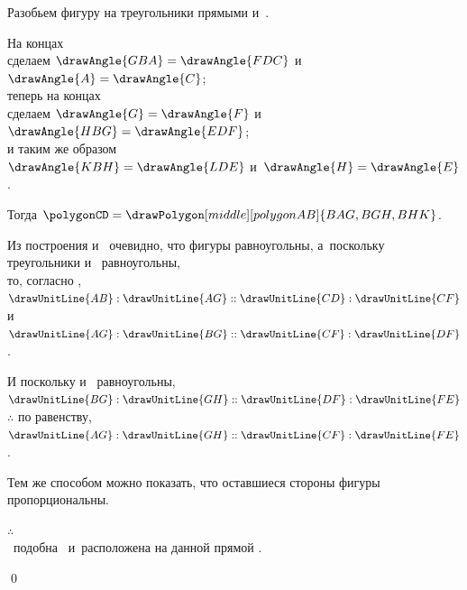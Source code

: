 \documentclass[letters,booklanguage=russian]{byrnebook}
\begin{document}
\begin{center}
Разобьем фигуру на треугольники прямыми  и~.

На концах \\
сделаем $\drawAngle{GBA} = \drawAngle{FDC}$ и~$\drawAngle{A} = \drawAngle{C}$;\\
теперь на концах \\
сделаем $\drawAngle{G} = \drawAngle{F}$ и~$\drawAngle{HBG} = \drawAngle{EDF}$;\\
и таким же образом\\
$\drawAngle{KBH} = \drawAngle{LDE}$ и~$\drawAngle{H} = \drawAngle{E}$.

Тогда $\polygonCD = \drawPolygon[middle][polygonAB]{BAG,BGH,BHK}$.

Из построения и~ очевидно, что фигуры равноугольны, а~поскольку треугольники  и~ равноугольны,\\
то, согласно ,
$\drawUnitLine{AB}:\drawUnitLine{AG} :: \drawUnitLine{CD} : \drawUnitLine{CF}$\\
и $\drawUnitLine{AG}:\drawUnitLine{BG} :: \drawUnitLine{CF} : \drawUnitLine{DF}$.

И поскольку  и~ равноугольны,\\
$\drawUnitLine{BG}:\drawUnitLine{GH} :: \drawUnitLine{DF} : \drawUnitLine{FE}$\\
$\therefore$ по равенству,\\
$\drawUnitLine{AG}:\drawUnitLine{GH} :: \drawUnitLine{CF} : \drawUnitLine{FE}$ .

Тем же способом можно показать, что оставшиеся стороны фигуры пропорциональны.

$\therefore$ \\
\polygonAB\ подобна \polygonCD\ и~расположена на данной прямой .
\end{center}

\qed
\end{document}
